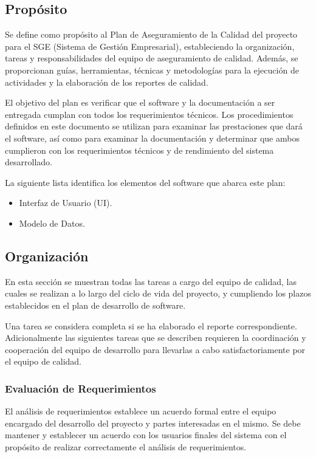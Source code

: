 \documentclass[a4paper,10pt]{article}
\begin{document}
	\subsection{Propósito}
	Se define como propósito al Plan de Aseguramiento de la Calidad del proyecto para el SGE (Sistema de Gestión Empresarial), estableciendo la organización, tareas y responsabilidades del equipo de aseguramiento de calidad. Además, se proporcionan guías, herramientas, técnicas y metodologías para la ejecución de actividades y la elaboración de los reportes de calidad.
	
	El objetivo del plan es verificar que el software y la documentación a ser entregada cumplan con todos los requerimientos técnicos. Los procedimientos definidos en este documento se utilizan para examinar las prestaciones que dará el software, así como para examinar la documentación y determinar que ambos cumplieron con los requerimientos técnicos y de rendimiento del sistema desarrollado.
	
	La siguiente lista identifica los elementos del software que abarca este plan:
	\begin{itemize}
		\item Interfaz de Usuario (UI).
		\item Modelo de Datos.
	\end{itemize}
	
	\subsection{Organización}
	En esta sección se muestran todas las tareas a cargo del equipo de calidad, las cuales se realizan a lo largo del ciclo de vida del proyecto, y cumpliendo los plazos establecidos en el plan de desarrollo de software.
	
	Una tarea se considera completa si se ha elaborado el reporte correspondiente. Adicionalmente las siguientes tareas que se describen requieren la coordinación y cooperación del equipo de desarrollo para llevarlas a cabo satisfactoriamente por el equipo de calidad.
	
	\subsubsection{Evaluación de Requerimientos}
	El análisis de requerimientos establece un acuerdo formal entre el equipo encargado del desarrollo del proyecto y partes interesadas en el mismo. Se debe mantener y establecer un acuerdo con los usuarios finales del sistema con el propósito de realizar correctamente el análisis de requerimientos.
	
\end{document}
